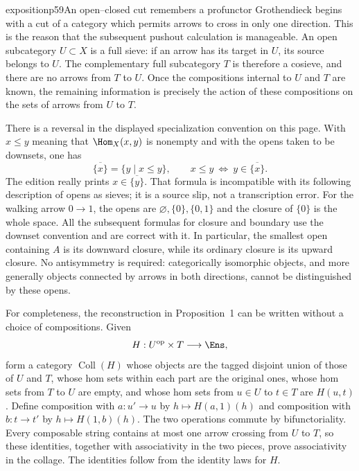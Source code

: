 
\begin{dcomment}{exposition}{p59}{An open--closed cut remembers a profunctor}
Grothendieck begins with a cut of a category which permits arrows to cross in only one direction. This is the reason that the subsequent pushout calculation is manageable. An open subcategory $U\subset X$ is a full sieve: if an arrow has its target in $U$, its source belongs to $U$. The complementary full subcategory $T$ is therefore a cosieve, and there are no arrows from $T$ to $U$. Once the compositions internal to $U$ and $T$ are known, the remaining information is precisely the action of these compositions on the sets of arrows from $U$ to $T$.

There is a reversal in the displayed specialization convention on this page. With $x\leq y$ meaning that $\Hom_X(x,y)$ is nonempty and with the opens taken to be downsets, one has
\[
 \overline{\{x\}}=\{y\mid x\leq y\},\qquad
 x\leq y\ \Longleftrightarrow\ y\in\overline{\{x\}}.
\]
The edition really prints $x\in\overline{\{y\}}$. That formula is incompatible with its following description of opens as sieves; it is a source slip, not a transcription error. For the walking arrow $0\to1$, the opens are $\varnothing,\{0\},\{0,1\}$ and the closure of $\{0\}$ is the whole space. All the subsequent formulas for closure and boundary use the downset convention and are correct with it. In particular, the smallest open containing $A$ is its downward closure, while its ordinary closure is its upward closure. No antisymmetry is required: categorically isomorphic objects, and more generally objects connected by arrows in both directions, cannot be distinguished by these opens.

For completeness, the reconstruction in Proposition~1 can be written without a choice of compositions. Given
\[
 H:U^{\mathrm{op}}\times T\longrightarrow\Ens,
\]
form a category $\operatorname{Coll}(H)$ whose objects are the tagged disjoint union of those of $U$ and $T$, whose hom sets within each part are the original ones, whose hom sets from $T$ to $U$ are empty, and whose hom sets from $u\in U$ to $t\in T$ are $H(u,t)$. Define composition with $a:u'\to u$ by $h\mapsto H(a,1)(h)$ and composition with $b:t\to t'$ by $h\mapsto H(1,b)(h)$. The two operations commute by bifunctoriality. Every composable string contains at most one arrow crossing from $U$ to $T$, so these identities, together with associativity in the two pieces, prove associativity in the collage. The identities follow from the identity laws for $H$.


\end{dcomment}
